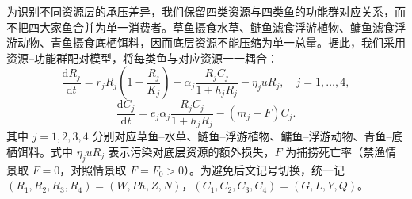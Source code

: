 为识别不同资源层的承压差异，我们保留四类资源与四类鱼的功能群对应关系，而不把四大家鱼合并为单一消费者。草鱼摄食水草、鲢鱼滤食浮游植物、鳙鱼滤食浮游动物、青鱼摄食底栖饵料，因而底层资源不能压缩为单一总量。据此，我们采用资源--功能群配对模型，将每类鱼与对应资源一一耦合：
\begin{equation}
\frac{\mathrm{d}R_j}{\mathrm{d}t}
=r_j R_j\left(1-\frac{R_j}{K_j}\right)-\alpha_j\frac{R_j C_j}{1+h_jR_j}-\eta_j u R_j,\quad j=1,\dots,4,
\end{equation}
\begin{equation}
\frac{\mathrm{d}C_j}{\mathrm{d}t}
=e_j\alpha_j\frac{R_j C_j}{1+h_jR_j}-(m_j+F)C_j.
\end{equation}
其中 $j=1,2,3,4$ 分别对应草鱼--水草、鲢鱼--浮游植物、鳙鱼--浮游动物、青鱼--底栖饵料。式中 $\eta_j u R_j$ 表示污染对底层资源的额外损失，$F$ 为捕捞死亡率（禁渔情景取 $F=0$，对照情景取 $F=F_0>0$）。为避免后文记号切换，统一记 $(R_1,R_2,R_3,R_4)=(W,Ph,Z,N)$，$(C_1,C_2,C_3,C_4)=(G,L,Y,Q)$。

